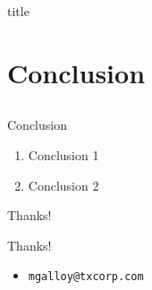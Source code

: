 \documentclass{beamer}
\begin{document}
\begin{frame}{title}
\end{frame}


\section{Conclusion}
\subsection*{}

\begin{frame}{Conclusion}
  \begin{enumerate}
    \item Conclusion 1
    \item Conclusion 2
  \end{enumerate}
\end{frame}

\begin{frame}{Thanks!}
  \begin{center}{\huge Thanks!}\end{center}
  \begin{itemize}
    \item {\tt mgalloy@txcorp.com}
  \end{itemize}
\end{frame}
\end{document}
